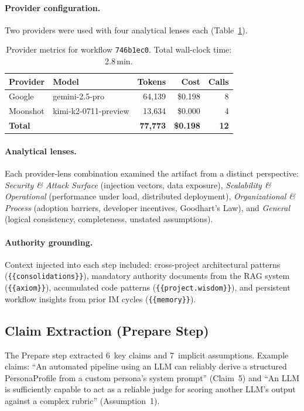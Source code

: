 \documentclass[11pt,a4paper]{article}
\begin{document}
\paragraph{Provider configuration.}
Two providers were used with four analytical lenses each (Table~\ref{tab:pilot-providers}).

\begin{table}[h]
\centering
\small
\begin{tabular}{@{}llrrr@{}}
\toprule
Provider & Model & Tokens & Cost & Calls \\ \midrule
Google & gemini-2.5-pro & 64{,}139 & \$0.198 & 8 \\
Moonshot & kimi-k2-0711-preview & 13{,}634 & \$0.000 & 4 \\
\midrule
\textbf{Total} & & \textbf{77{,}773} & \textbf{\$0.198} & \textbf{12} \\
\bottomrule
\end{tabular}
\caption{Provider metrics for workflow \texttt{746b1ec0}. Total wall-clock time: 2.8\,min.}
\label{tab:pilot-providers}
\end{table}

\paragraph{Analytical lenses.}
Each provider-lens combination examined the artifact from a distinct perspective: \emph{Security \& Attack Surface} (injection vectors, data exposure), \emph{Scalability \& Operational} (performance under load, distributed deployment), \emph{Organizational \& Process} (adoption barriers, developer incentives, Goodhart's Law), and \emph{General} (logical consistency, completeness, unstated assumptions).

\paragraph{Authority grounding.}
Context injected into each step included: cross-project architectural patterns (\texttt{\{\{consolidations\}\}}), mandatory authority documents from the RAG system (\texttt{\{\{axiom\}\}}), accumulated code patterns (\texttt{\{\{project.wisdom\}\}}), and persistent workflow insights from prior IM cycles (\texttt{\{\{memory\}\}}).

\subsection{Claim Extraction (Prepare Step)}
The Prepare step extracted 6~key claims and 7~implicit assumptions.
Example claims: ``An automated pipeline using an LLM can reliably derive a structured PersonaProfile from a custom persona's system prompt'' (Claim~5) and ``An LLM is sufficiently capable to act as a reliable judge for scoring another LLM's output against a complex rubric'' (Assumption~1).
\end{document}
